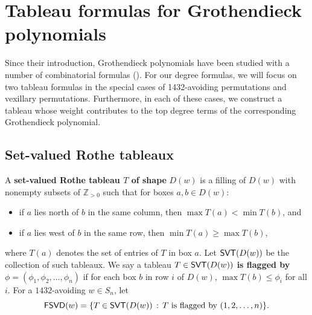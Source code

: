 \documentclass[12pt]{amsart}
\theoremstyle{definition}
\theoremstyle{remark}
\numberwithin{equation}{section}
\newcommand\mydef[1]{{\bf #1}}
\newcommand{\FSVD}{{\sf FSVD}}
\newcommand{\SVT}{{\sf SVT}}
\newcommand{\Sym}{S}
\begin{document}
\section{Tableau formulas for Grothendieck polynomials}
\label{section:tableau}

Since their introduction, Grothendieck polynomials have been studied with a number of combinatorial formulas (\cite{FominKrillov, Le00, Buch}).  For our degree formulas, we will focus on two tableau formulas in the special cases of 1432-avoiding permutations and vexillary permutations.  Furthermore, in each of these cases, we construct a tableau whose weight contributes to the top degree terms of the corresponding Grothendieck polynomial.

\subsection{Set-valued Rothe tableaux}

\label{sec:1432}


A \mydef{set-valued Rothe tableau $T$ of shape} $D(w)$ is a filling 
of $D(w)$ with nonempty subsets of $\mathbb{Z}_{>0}$ such that for boxes $a,b\in D(w)$:
\begin{itemize}
    \item if $a$ lies north of $b$ in the same column, then $\max T(a)<\min T(b)$, and
    \item if $a$ lies west of $b$ in the same row, then $\min T(a)\geq\max T(b)$,
\end{itemize}
where $T(a)$ denotes the set of entries of $T$ in box $a$.
Let $\SVT(D(w))$ be the collection of such tableaux. 
We say a tableau $T \in \SVT(D(w))$ \mydef{is flagged by}
$\phi=(\phi_1,\phi_2,\ldots,\phi_n)$ if for each box $b$ in row $i$ of $D(w)$, $\max{T(b)}\leq \phi_i$ for all $i$. For a $1432$-avoiding $w\in \Sym_n$, let 
\[\FSVD(w)=\{T\in \SVT(D(w)) \,:  \, T \mbox{ is flagged by } (1,2, \ldots,n)\}.\]
\end{document}
